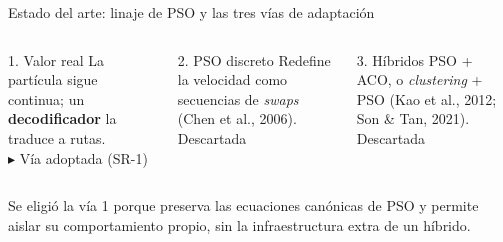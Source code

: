 \documentclass[aspectratio=169, 11pt, xcolor={dvipsnames,table}]{beamer}
\newcommand{\azul}[1]{\textcolor{UsachAzul}{#1}}
\newcommand{\gris}[1]{\textcolor{UsachGris}{#1}}
\begin{document}
\begin{frame}{Estado del arte: linaje de PSO y las tres vías de adaptación}
\centering
{}

\vspace{14pt}
\begin{columns}[t]
\begin{exampleblock}{1. Valor real}
\scriptsize
La partícula sigue continua; un \textbf{decodificador} la traduce a rutas.\\[3pt]
\azul{$\blacktriangleright$ Vía adoptada (SR-1)}
\end{exampleblock}
\begin{block}{2. PSO discreto}
\scriptsize
Redefine la velocidad como secuencias de \textit{swaps} (Chen et al., 2006).\\[3pt]
\gris{Descartada}
\end{block}
\begin{block}{3. Híbridos}
\scriptsize
PSO + ACO, o \textit{clustering} + PSO (Kao et al., 2012; Son \& Tan, 2021).\\[3pt]
\gris{Descartada}
\end{block}
\end{columns}
\vspace{8pt}
{\scriptsize Se eligió la vía 1 porque \azul{preserva las ecuaciones canónicas de PSO} y permite aislar su comportamiento propio, sin la infraestructura extra de un híbrido.}
\end{frame}
\end{document}
